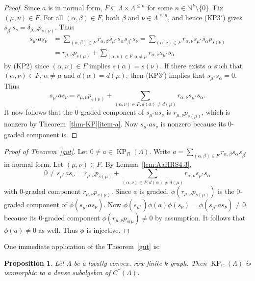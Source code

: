 \documentclass[a4paper,12pt]{amsart}
\numberwithin{equation}{section}
\newtheorem{prop}[thm]{Proposition}
\theoremstyle{definition}
\theoremstyle{remark}
\begin{document}
\begin{proof} Since $a$ is in normal form, $F\subseteq \Lambda\times \Lambda^{\leq n}$ for some $n \in {\mathbb{N}}^k \setminus\{0\}$. Fix $(\mu,\nu)\in F$. For all $(\alpha,\beta)\in F$, both $\beta$ and $\nu\in\Lambda^{\leq n}$, and hence (KP3$'$) gives $s_{\beta^*}s_\nu=\delta_{\beta,\nu}p_{s(\nu)}$. Thus
\begin{align*}
s_{\mu^*}as_\nu 
&=\sum_{(\alpha,\beta) \in F} r_{\alpha,\beta}s_{\mu^*}s_\alpha s_{\beta^*} s_\nu 
=\sum_{(\alpha,\nu) \in F} r_{\alpha,\nu}s_{\mu^*}s_\alpha p_{s(\nu)}\\
&= r_{\mu,\nu}p_{s(\mu)}+\sum_{(\alpha,\nu) \in F, \alpha\neq\mu } r_{\alpha,\nu}s_{\mu^*}s_\alpha
\end{align*}
by (KP2) since $(\alpha,\nu)\in F$ implies $s(\alpha)=s(\nu)$. If  there exists $\alpha$ such that $(\alpha,\nu)\in F$, $\alpha\neq\mu$ and $d(\alpha)=d(\mu)$, then (KP3$'$) implies that $s_{\mu^*}s_\alpha=0$. Thus 
\[
s_{\mu^*}as_\nu = r_{\mu,\nu}p_{s(\mu)}+\sum_{(\alpha,\nu)\in F, d(\alpha)\neq d(\mu)} r_{\alpha,\nu}s_{\mu^*}s_\alpha.
\]
It now follows that the $0$-graded component of $s_{\mu^*}as_\nu $ is $r_{\mu,\nu}p_{s(\mu)}$, which is nonzero by Theorem~\ref{thm-KP}\eqref{item-a}.  Now $s_{\mu^*}as_\nu$ is nonzero because its $0$-graded component is.
\end{proof}

\begin{proof}[Proof of Theorem~\ref{gut}]
  Let $0\neq a \in \operatorname{KP}_R(\Lambda)$.  Write
$a = \sum_{(\alpha, \beta) \in F} r_{\alpha, \beta}s_\alpha s_{\beta^{*}}$  in normal form. Let $(\mu,\nu)\in F$. By Lemma~\ref{lem:AaHRS4.3}, 
\[
0 \neq s_{\mu^*}as_\nu = r_{\mu,\nu}p_{s(\mu)}+\sum_{(\alpha,\nu)\in F, d(\alpha)\neq d(\mu)} 
r_{\alpha,\nu}s_{\mu^*}s_\alpha
\]
with $0$-graded component $r_{\mu,\nu}p_{s(\mu)}$.
Since $\phi$ is graded, 
$\phi(r_{\mu,\nu}p_{s(\mu)})$ is the $0$-graded component of 
$\phi(s_{\mu^*}as_{\nu})$.  Now $\phi(s_{\mu^*})\phi(a)\phi(s_{\nu})=\phi(s_{\mu^*}as_{\nu})\neq 0$ because its $0$-graded component $\phi(r_{\mu,\nu}p_{s(\mu})\neq 0$ by assumption. It follows that $\phi(a) \neq 0$ as well. Thus $\phi$ is injective.
\end{proof}

One immediate application of the Theorem~\ref{gut} is:

\begin{prop}
 Let $\Lambda$ be a locally convex, row-finite $k$-graph.  Then $\operatorname{KP}_{\mathbb{C}}(\Lambda)$ is isomorphic to 
a dense subalgebra of $C^*(\Lambda)$.
\end{prop}
\end{document}
